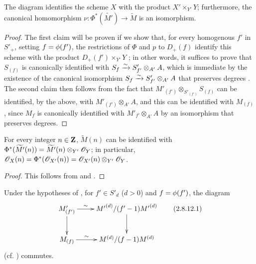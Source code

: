 \begin{proposition}[2.8.10]
\label{II.2.8.10}
The diagram  identifies the scheme $X$ with the product $X'\times_{Y'}Y$;
furthermore, the canonical homomorphism $\nu:\Phi^*(\widetilde{M'})\to\widetilde{M}$  is an isomorphism.
\end{proposition}

\begin{proof}
The first claim will be proven if we show that, for every homogenous $f'$ in $S'_+$, setting $f=\phi(f')$, the restrictions of $\Phi$ and $p$ to $D_+(f)$ identify this scheme with the product $D_+(f')\times_{Y'}Y$ ;
in other words, it suffices  to prove that $S_{(f)}$ is canonically identified with $S_f\xrightarrow{\sim} S'_{f'}\otimes_{A'}A$, which is immediate by the existence of the canonical isomorphism $S_f\xrightarrow{\sim} S'_{f'}\otimes_{A'}A$ that preserves degrees .
The second claim then follows from the fact that $M'_{(f')}\otimes_{S'_{(f')}}S_{(f)}$ can be identified, by the above, with $M'_{(f')}\otimes_{A'}A$, and this can be identified with $M_{(f)}$, since $M_f$ is canonically identified with $M'_{f'}\otimes_{A'}A$ by an isomorphism that preserves degrees.
\end{proof}

\begin{corollary}[2.8.11]
\label{II.2.8.11}
For every integer $n\in\mathbf{Z}$, $\widetilde{M}(n)$ can be identified with $\Phi^*(\widetilde{M'}(n))=\widetilde{M'}(n)\otimes_{Y'}\mathscr{O}_Y$;
in particular, $\mathscr{O}_X(n)=\Phi^*(\mathscr{O}_{X'}(n))=\mathscr{O}_{X'}(n)\otimes_{Y'}\mathscr{O}_Y$.
\end{corollary}

\begin{proof}
This follows from  and .
\end{proof}


\begin{env}[2.8.12]
\label{II.2.8.12}
Under the hypotheses of , for $f'\in S'_d$ ($d>0$) and $f=\phi(f')$, the diagram
\[
\label{II.2.8.12.1}
  \xymatrix{
    M'_{(f')} \ar[r]^-{\sim} \ar[d]
    & {M'}^{(d)}/(f'-1){M'}^{(d)} \ar[d]
  \\M_{(f)} \ar[r]^-{\sim}
    & M^{(d)}/(f-1)M^{(d)}
  }
  \tag{2.8.12.1}
\]
(cf. ) commutes.
\end{env}

